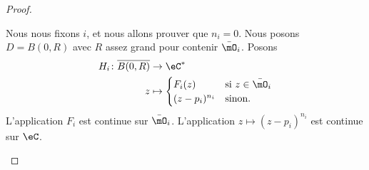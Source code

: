 \begin{proof}
\begin{subproof}
		Nous nous fixons \( i\), et nous allons prouver que \( n_i=0\). Nous posons \( D=B(0,R)\) avec \( R\) assez grand pour contenir \( \bar\mO_i\). Posons
		\begin{equation}
			\begin{aligned}
				H_i\colon \overline{ B(0,R) } & \to \eC^*                                        \\
				z                             & \mapsto \begin{cases}
					                                        F_i(z)        & \text{si } z\in\bar\mO_i \\
					                                        (z-p_i)^{n_i} & \text{sinon. }
				                                        \end{cases}
			\end{aligned}
		\end{equation}
		L'application \( F_i\) est continue sur \( \bar\mO_i\). L'application \( z\mapsto (z-p_i)^{n_i}\) est continue sur \( \eC\).


\end{subproof}
\end{proof}
